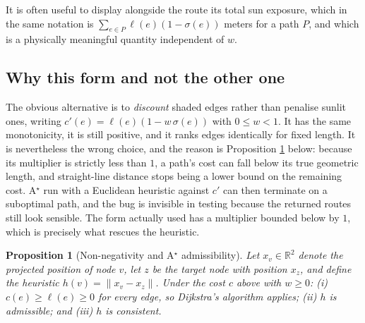 \documentclass[11pt,a4paper]{article}
\theoremstyle{plain}
\newtheorem{proposition}{Proposition}
\theoremstyle{definition}
\theoremstyle{remark}
\begin{document}
It is often useful to display alongside the route its total sun exposure, which in the same notation is $\sum_{e \in P} \ell(e)(1 - \sigma(e))$ meters for a path $P$, and which is a physically meaningful quantity independent of $w$.

\subsection{Why this form and not the other one}

The obvious alternative is to \emph{discount} shaded edges rather than penalise sunlit ones, writing $c'(e) = \ell(e)(1 - w\,\sigma(e))$ with $0 \le w < 1$. It has the same monotonicity, it is still positive, and it ranks edges identically for fixed length. It is nevertheless the wrong choice, and the reason is Proposition \ref{prop:astar} below: because its multiplier is strictly less than $1$, a path's cost can fall below its true geometric length, and straight-line distance stops being a lower bound on the remaining cost. A$^\star$ run with a Euclidean heuristic against $c'$ can then terminate on a suboptimal path, and the bug is invisible in testing because the returned routes still look sensible. The form actually used has a multiplier bounded below by $1$, which is precisely what rescues the heuristic.

\begin{proposition}[Non-negativity and A$^\star$ admissibility]
\label{prop:astar}
Let $x_v \in \mathbb{R}^2$ denote the projected position of node $v$, let $z$ be the target node with position $x_z$, and define the heuristic $h(v) = \lVert x_v - x_z \rVert$. Under the cost $c$ above with $w \ge 0$: (i) $c(e) \ge \ell(e) \ge 0$ for every edge, so Dijkstra's algorithm applies; (ii) $h$ is admissible; and (iii) $h$ is consistent.
\end{proposition}
\end{document}
